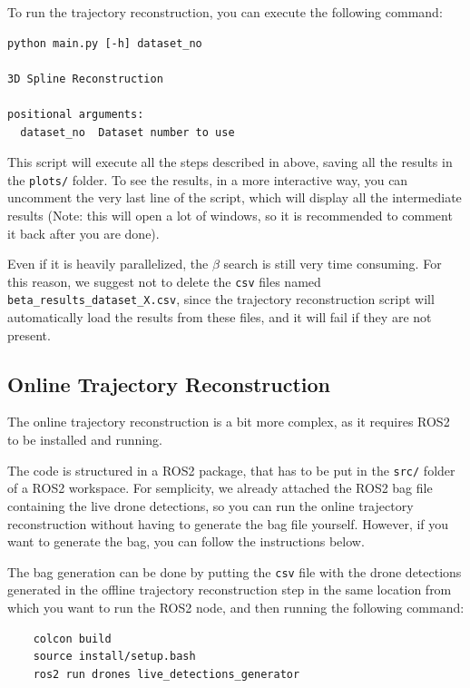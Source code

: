 \documentclass[11pt]{article}
\begin{document}
To run the trajectory reconstruction, you can execute the following command:

\begin{verbatim}
python main.py [-h] dataset_no

3D Spline Reconstruction

positional arguments:
  dataset_no  Dataset number to use
\end{verbatim}

This script will execute all the steps described in above, saving all the results in the \texttt{plots/} folder. To see the results, in a more interactive way, you can uncomment the very last line of the script, which will display all the intermediate results (Note: this will open a lot of windows, so it is recommended to comment it back after you are done).

Even if it is heavily parallelized, the $\beta$ search is still very time consuming. For this reason, we suggest not to delete the \texttt{csv} files named \texttt{beta\_results\_dataset\_X.csv}, since the trajectory reconstruction script will automatically load the results from these files, and it will fail if they are not present.

\subsection{Online Trajectory Reconstruction}

The online trajectory reconstruction is a bit more complex, as it requires ROS2 to be installed and running.

The code is structured in a ROS2 package, that has to be put in the \texttt{src/} folder of a ROS2 workspace. For semplicity, we already attached the ROS2 bag file containing the live drone detections, so you can run the online trajectory reconstruction without having to generate the bag file yourself. However, if you want to generate the bag, you can follow the instructions below.

The bag generation can be done by putting the \texttt{csv} file with the drone detections generated in the offline trajectory reconstruction step in the same location from which you want to run the ROS2 node, and then running the following command:

\begin{verbatim}
    colcon build
    source install/setup.bash
    ros2 run drones live_detections_generator
\end{verbatim}
\end{document}
